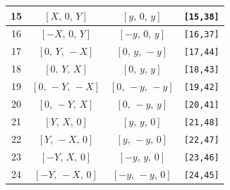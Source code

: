 \documentclass[fleqn,8pt]{jsarticle}
\begin{document}
\begin{longtable}{cccc}
15 & $\left[ X,\, 0,\, Y \right]$ & $\left[ y,\, 0,\, y \right]$ & {\tt [15,38]} \\ \hline
16 & $\left[ - X,\, 0,\, Y \right]$ & $\left[ - y,\, 0,\, y \right]$ & {\tt [16,37]} \\ \hline
17 & $\left[ 0,\, Y,\, - X \right]$ & $\left[ 0,\, y,\, - y \right]$ & {\tt [17,44]} \\ \hline
18 & $\left[ 0,\, Y,\, X \right]$ & $\left[ 0,\, y,\, y \right]$ & {\tt [18,43]} \\ \hline
19 & $\left[ 0,\, - Y,\, - X \right]$ & $\left[ 0,\, - y,\, - y \right]$ & {\tt [19,42]} \\ \hline
20 & $\left[ 0,\, - Y,\, X \right]$ & $\left[ 0,\, - y,\, y \right]$ & {\tt [20,41]} \\ \hline
21 & $\left[ Y,\, X,\, 0 \right]$ & $\left[ y,\, y,\, 0 \right]$ & {\tt [21,48]} \\ \hline
22 & $\left[ Y,\, - X,\, 0 \right]$ & $\left[ y,\, - y,\, 0 \right]$ & {\tt [22,47]} \\ \hline
23 & $\left[ - Y,\, X,\, 0 \right]$ & $\left[ - y,\, y,\, 0 \right]$ & {\tt [23,46]} \\ \hline
24 & $\left[ - Y,\, - X,\, 0 \right]$ & $\left[ - y,\, - y,\, 0 \right]$ & {\tt [24,45]} \\
\end{longtable}
\renewcommand{\arraystretch}{1.2}
\end{document}
